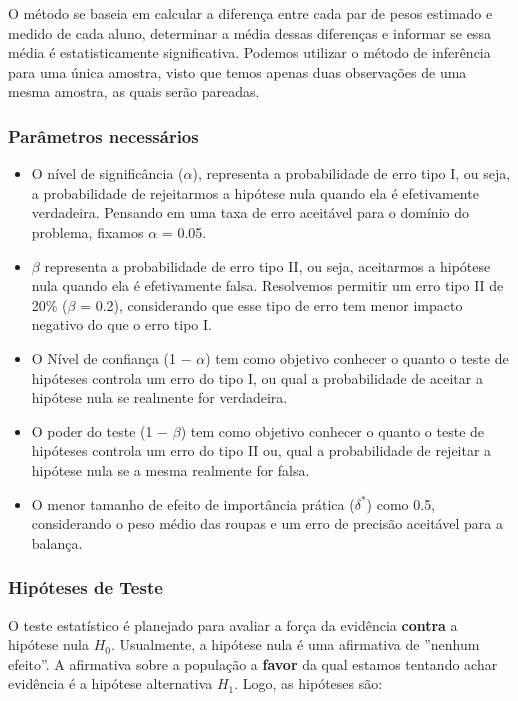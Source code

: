 \documentclass[]{article}
\begin{document}
\quad O método se baseia em calcular a diferença entre cada par de pesos
estimado e medido de cada aluno, determinar a média dessas diferenças e
informar se essa média é estatisticamente significativa. Podemos
utilizar o método de inferência para uma única amostra, visto que temos
apenas duas observações de uma mesma amostra, as quais serão pareadas.

\subsubsection{Parâmetros necessários}\label{parametros-necessarios}

\begin{itemize}
\item
  O nível de significância ($\alpha$), representa a probabilidade de
  erro tipo I, ou seja, a probabilidade de rejeitarmos a hipótese nula
  quando ela é efetivamente verdadeira. Pensando em uma taxa de erro
  aceitável para o domínio do problema, fixamos $\alpha$ = 0.05.
\item
  $\beta$ representa a probabilidade de erro tipo II, ou seja,
  aceitarmos a hipótese nula quando ela é efetivamente falsa. Resolvemos
  permitir um erro tipo II de 20\% ($\beta$ = 0.2), considerando que
  esse tipo de erro tem menor impacto negativo do que o erro tipo I.
\item
  O Nível de confiança (1 − $\alpha$) tem como objetivo conhecer o
  quanto o teste de hipóteses controla um erro do tipo I, ou qual a
  probabilidade de aceitar a hipótese nula se realmente for verdadeira.
\item
  O poder do teste (1 − $\beta$) tem como objetivo conhecer o quanto o
  teste de hipóteses controla um erro do tipo II ou, qual a
  probabilidade de rejeitar a hipótese nula se a mesma realmente for
  falsa.
\item
  O menor tamanho de efeito de importância prática ($\delta^{*}$) como
  0.5, considerando o peso médio das roupas e um erro de precisão
  aceitável para a balança.
\end{itemize}

\subsubsection{Hipóteses de Teste}\label{hipoteses-de-teste}

\quad O teste estatístico é planejado para avaliar a força da evidência
\textbf{contra} a hipótese nula $H_{0}$. Usualmente, a hipótese nula é
uma afirmativa de ''nenhum efeito''. A afirmativa sobre a população a
\textbf{favor} da qual estamos tentando achar evidência é a hipótese
alternativa $H_{1}$. Logo, as hipóteses são:
\end{document}
